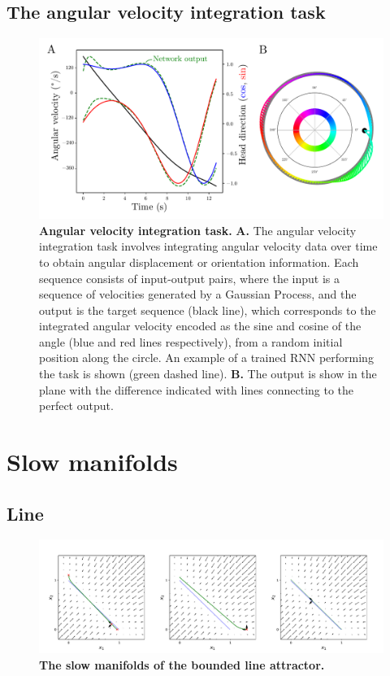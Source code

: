\documentclass{article}
\newcounter{ct}
\theoremstyle{definition}
\theoremstyle{remark}
\begin{document}
\subsection{The angular velocity integration task}
\begin{figure}[H]
    \centering
    \includegraphics[width=\textwidth]{figures/angular_task.pdf}
    \caption{\textbf{Angular velocity integration task.}
    \textbf{A.} The angular velocity integration task involves integrating angular velocity data over time to obtain angular displacement or orientation information.
    Each sequence consists of input-output pairs, where the input is a sequence of velocities generated by a Gaussian Process, and the output is the target sequence (black line), which corresponds to the integrated angular velocity encoded as the sine and cosine of the angle (blue and red lines respectively), from a random initial position along the circle.
    An example of a trained RNN performing the task is shown (green dashed line).
    \textbf{B.} The output is show in the plane with the difference indicated with lines connecting to the perfect output.
    }
    \label{fig:angular_task}
\end{figure}


\newpage
\section{Slow manifolds}
\subsection{Line}
\begin{figure}[H]
    \centering
    \includegraphics[width=\textwidth]{figures/bla_slowmanifolds.pdf}
    \caption{\textbf{The slow manifolds of the bounded line attractor.}}
    \label{fig:bla_slowmanifolds}
\end{figure}
\end{document}

